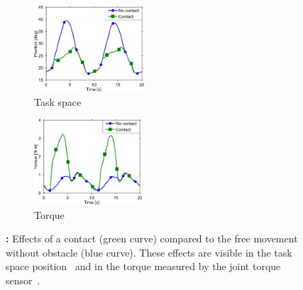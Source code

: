 
%
%

%
	\begin{figure}[t]
		\centering
		\begin{subfigure}[t]{0.48\hsize}
			\centering
			\includegraphics[height=3.2cm]{robertoICRA/fig/exp1_effectContactQ}%
			\caption{Task space}
			\label{fig:exp1:effects_contact:a}
		\end{subfigure}
		\hfill
		\begin{subfigure}[t]{0.48\hsize}
			\centering
			\includegraphics[height=3.2cm]{robertoICRA/fig/exp1_effectContactT}
			\caption{Torque}
			\label{fig:exp1:effects_contact:b}
		\end{subfigure}
		\caption{\textbf{:} Effects of a contact (green curve) compared to the free movement without obstacle (blue curve). 
		These effects are visible in the task space position~ and in the torque measured by the joint torque sensor~.
		}
		\label{fig:exp1:effects_contact}
        \figspace
	\end{figure}


